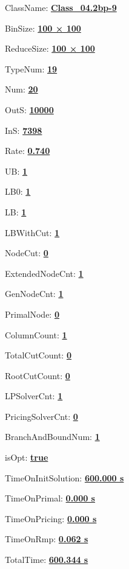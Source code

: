 \documentclass[11pt]{article}
\begin{document}
\pagestyle{empty}


ClassName: \underline{\textbf{Class_04.2bp-9}}
\par
BinSize: \underline{\textbf{100 × 100}}
\par
ReduceSize: \underline{\textbf{100 × 100}}
\par
TypeNum: \underline{\textbf{19}}
\par
Num: \underline{\textbf{20}}
\par
OutS: \underline{\textbf{10000}}
\par
InS: \underline{\textbf{7398}}
\par
Rate: \underline{\textbf{0.740}}
\par
UB: \underline{\textbf{1}}
\par
LB0: \underline{\textbf{1}}
\par
LB: \underline{\textbf{1}}
\par
LBWithCut: \underline{\textbf{1}}
\par
NodeCut: \underline{\textbf{0}}
\par
ExtendedNodeCnt: \underline{\textbf{1}}
\par
GenNodeCnt: \underline{\textbf{1}}
\par
PrimalNode: \underline{\textbf{0}}
\par
ColumnCount: \underline{\textbf{1}}
\par
TotalCutCount: \underline{\textbf{0}}
\par
RootCutCount: \underline{\textbf{0}}
\par
LPSolverCnt: \underline{\textbf{1}}
\par
PricingSolverCnt: \underline{\textbf{0}}
\par
BranchAndBoundNum: \underline{\textbf{1}}
\par
isOpt: \underline{\textbf{true}}
\par
TimeOnInitSolution: \underline{\textbf{600.000 s}}
\par
TimeOnPrimal: \underline{\textbf{0.000 s}}
\par
TimeOnPricing: \underline{\textbf{0.000 s}}
\par
TimeOnRmp: \underline{\textbf{0.062 s}}
\par
TotalTime: \underline{\textbf{600.344 s}}
\par
\newpage
\end{document}
